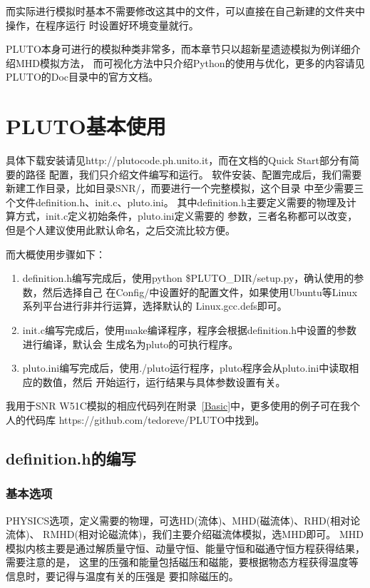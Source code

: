 而实际进行模拟时基本不需要修改这其中的文件，可以直接在自己新建的文件夹中操作，在程序运行
时设置好环境变量就行。

PLUTO本身可进行的模拟种类非常多，而本章节只以超新星遗迹模拟为例详细介绍MHD模拟方法，
而可视化方法中只介绍Python的使用与优化，更多的内容请见PLUTO的Doc目录中的官方文档。

\section{PLUTO基本使用}
\label{PLUTOuse}
具体下载安装请见http://plutocode.ph.unito.it，而在文档的Quick Start部分有简要的路径
配置，我们只介绍文件编写和运行。
软件安装、配置完成后，我们需要新建工作目录，比如目录SNR/，而要进行一个完整模拟，这个目录
中至少需要三个文件definition.h、init.c、pluto.ini。
其中definition.h主要定义需要的物理及计算方式，init.c定义初始条件，pluto.ini定义需要的
参数，三者名称都可以改变，但是个人建议使用此默认命名，之后交流比较方便。

而大概使用步骤如下：
\begin{enumerate}

    \item definition.h编写完成后，使用python \$PLUTO\_DIR/setup.py，确认使用的参数，然后选择自己
    在Config/中设置好的配置文件，如果使用Ubuntu等Linux系列平台进行非并行运算，选择默认的
    Linux.gcc.defs即可。

    \item init.c编写完成后，使用make编译程序，程序会根据definition.h中设置的参数进行编译，默认会
    生成名为pluto的可执行程序。

    \item pluto.ini编写完成后，使用./pluto运行程序，pluto程序会从pluto.ini中读取相应的数值，然后
    开始运行，运行结果与具体参数设置有关。

\end{enumerate}
我用于SNR W51C模拟的相应代码列在附录~\ref{Basic}中，更多使用的例子可在我个人的代码库
https://github.com/tedoreve/PLUTO中找到。

\subsection{definition.h的编写}
\subsubsection{基本选项}

PHYSICS选项，定义需要的物理，可选HD(流体)、MHD(磁流体)、RHD(相对论流体)、
RMHD(相对论磁流体)，我们主要介绍磁流体模拟，选MHD即可。
MHD模拟内核主要是通过解质量守恒、动量守恒、能量守恒和磁通守恒方程获得结果，需要注意的是，
这里的压强和能量包括磁压和磁能，要根据物态方程获得温度等信息时，要记得与温度有关的压强是
要扣除磁压的。

